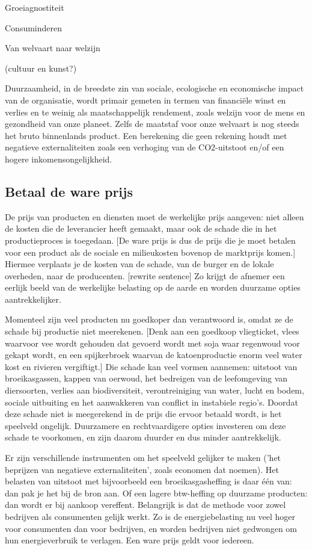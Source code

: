 Groeiagnostiteit

Consuminderen

Van welvaart naar welzijn

(cultuur en kunst?)

Duurzaamheid, in de breedste zin van sociale, ecologische en economische impact van de organisatie, wordt primair gemeten in termen van financiële winst en verlies en te weinig als maatschappelijk rendement, zoals welzijn voor de mens en gezondheid van onze planeet. Zelfs de maatstaf voor onze welvaart is nog steeds het bruto binnenlands product. Een berekening die geen rekening houdt met negatieve externaliteiten zoals een verhoging van de CO2-uitstoot en/of een hogere inkomensongelijkheid. 

\subsection{Betaal de ware prijs}
De prijs van producten en diensten moet de werkelijke prijs aangeven: niet alleen de kosten die de leverancier heeft gemaakt, maar ook de schade die in het productieproces is toegedaan. [De ware prijs is dus de prijs die je moet betalen voor een product als de sociale en milieukosten bovenop de marktprijs komen.] Hiermee verplaats je de kosten van de schade, van de burger en de lokale overheden, naar de producenten. [rewrite sentence] Zo krijgt de afnemer een eerlijk beeld van de werkelijke belasting op de aarde en worden duurzame opties aantrekkelijker.

Momenteel zijn veel producten nu goedkoper dan verantwoord is, omdat ze de schade bij productie niet meerekenen. [Denk aan een goedkoop vliegticket, vlees waarvoor vee wordt gehouden dat gevoerd wordt met soja waar regenwoud voor gekapt wordt, en een spijkerbroek waarvan de katoenproductie enorm veel water kost en rivieren vergiftigt.] Die schade kan veel vormen aannemen: uitstoot van broeikasgassen, kappen van oerwoud, het bedreigen van de leefomgeving van diersoorten, verlies aan biodiversiteit, verontreiniging van water, lucht en bodem, sociale uitbuiting en het aanwakkeren van conflict in instabiele regio's. Doordat deze schade niet is meegerekend in de prijs die ervoor betaald wordt, is het speelveld ongelijk. Duurzamere en rechtvaardigere opties investeren om deze schade te voorkomen, en zijn daarom duurder en dus minder aantrekkelijk.

Er zijn verschillende instrumenten om het speelveld gelijker te maken ('het beprijzen van negatieve externaliteiten', zoals economen dat noemen). Het belasten van uitstoot met bijvoorbeeld een broeikasgasheffing is daar één van: dan pak je het bij de bron aan. Of een lagere btw-heffing op duurzame producten: dan wordt er bij aankoop vereffent. Belangrijk is dat de methode voor zowel bedrijven als consumenten gelijk werkt. Zo is de energiebelasting nu veel hoger voor consumenten dan voor bedrijven, en worden bedrijven niet gedwongen om hun energieverbruik te verlagen. Een ware prijs geldt voor iedereen.

